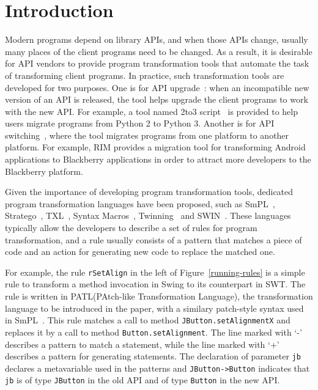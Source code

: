 \documentclass[a4paper, USenglish]{lipics-v2016}
\newcommand{\code}[1]{\texttt{\footnotesize #1}}
\newcommand{\PATL}{PATL\xspace}
\theoremstyle{plain}
\begin{document}
\section{Introduction}
\label{sec:intro}
Modern programs depend on library APIs, and when those APIs change, usually
many places of the client programs need to be changed. As a result, it
is desirable for API vendors to provide program transformation tools
that automate the task of transforming client programs. 
In practice, such transformation tools are developed for two purposes.
One is for API upgrade~\cite{Dig:2006:AES:1133105.1133107,Li:2013:WSA:2514946.2515486}: when an incompatible new version of an API is released, the tool helps upgrade the client programs to work with the new
API. For example, a tool named 2to3 script~\cite{Pilgrim:2009:DP:1655836} is provided to
help users migrate programs from Python 2 to Python 3. Another is for
API switching~\cite{246}, where the tool migrates programs from
one platform to another platform. For example, RIM provides a
migration tool for transforming Android applications to Blackberry
applications in order to attract more developers to the Blackberry
platform. 

Given the importance of developing program transformation tools,
dedicated program transformation languages have been proposed, such as SmPL~\cite{DBLP:conf/eurosys/PadioleauLHM08}, Stratego~\cite{Bravenboer:2008:SLT:1385689.1385715},
TXL~\cite{Cordy:2006:TST:1149670.1149672}, Syntax Macros~\cite{Weise:1993:PSM:155090.155105}, Twinning~\cite{Nita:2010:UTA:1806799.1806832} and SWIN~\cite{Li:2015:STT:2678015.2682534}. These languages typically allow
the developers to describe a set of rules for program transformation, and a rule usually consists of a pattern that matches a piece of code and an action for generating new code to replace the matched one. 

For example, the rule \code{rSetAlign} in the left of Figure~\ref{running-rules} is a simple rule to transform a method invocation in Swing to its counterpart in SWT. The rule is written in \PATL (PAtch-like Transformation Language), the transformation language to be introduced in the paper, with a similary patch-style syntax used in SmPL~\cite{DBLP:conf/eurosys/PadioleauLHM08}. This rule matches a call to method \code{JButton.setAlignmentX} and replaces it by
a call to method \code{Button.setAlignment}. The line marked with `-' describes a
pattern to match a statement, while the line marked with `+' describes
a pattern for generating statements. 
The declaration of parameter \code{jb} declares a metavariable used in the patterns and \code{JButton->Button} indicates that \code{jb} is of type \code{JButton} in the old API and of type \code{Button} in the new API.
\end{document}
